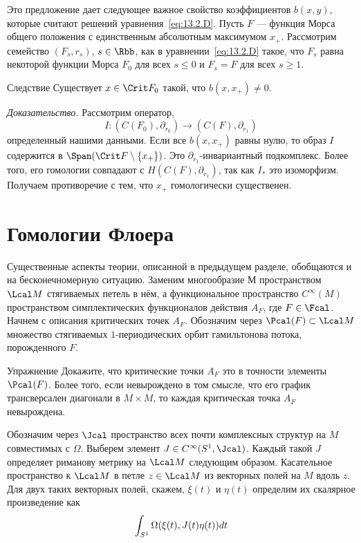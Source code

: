 Это предложение дает следующее важное свойство коэффициентов $b(x,
y)$, которые считают   решений
уравнения~\ref{eq:13.2.D}. 
Пусть $F$ --- функция Морса общего положения с единственным абсолютным
максимумом $x_{+}$.
Рассмотрим семейство $(F_{s},r_{s})$, $s\in\Rbb$, как в
уравнении~\ref{eq:13.2.D} такое, что $F_{s}$ равна некоторой функции
Морса $F_{0}$ для всех $s\leq0$ и $F_{s} = F$ для всех $s\geq1$.


\begin{thm}{Следствие}\label{13.2.H}
  Существует $x\in\Crit F_{0}$ такой, что $b(x, x_{+})\neq0$.  
\end{thm}

\noindent\textit{Доказательство.}
Рассмотрим оператор,
\[
I:(C(F_{0}),\partial_{r_{0}})\to (C(F),\partial_{r_{1}})
\]
определенный нашими данными.
Если все $b(x,x_{+})$ равны нулю, то образ $I$ содержится в
$\Span(\Crit F\setminus\{x_{+}\})$. 
Это $\partial_{r_{1}}$-инвариантный подкомплекс.
Более того, его гомологии совпадают с $H(C(F),\partial_{r_{1}})$,
так как $I_{*}$ это изоморфизм.
Получаем противоречие с тем, что $x_{+}$ гомологически существенен.
\qeds

\section{Гомологии Флоера}\label{sec:13.3}
Существенные аспекты теории, описанной в предыдущем разделе,
обобщаются и на бесконечномерную ситуацию.  Заменим многообразие $М$
пространством $\Lcal M$ стягиваемых петель в нём, а функциональное
пространство $C^{\infty}(M)$ пространством симплектических
функционалов действия $A_{F}$, где $F\in\Fcal$.
Начнем с описания критических точек $A_{F}$.
Обозначим через $\Pcal(F)\subset\Lcal M$ множество стягиваемых
$1$-периодических орбит гамильтонова потока, порожденного $F$.

\begin{ex}{Упражнение}\label{13.3.A}
  Докажите, что критические точки $A_{F}$ это в точности элементы
  $\Pcal(F)$.
  Более того, если  невырождено в том смысле, что его график
  трансверсален диагонали в $M\times M$, то каждая критическая точка
  $A_{F}$ невырождена.
\end{ex}
Обозначим через $\Jcal$ пространство всех почти комплексных структур
на $M$ совместимых с $\Omega$.
Выберем элемент $J\in C^{\infty}(S^{1},\Jcal)$.
Каждый такой $J$ определяет риманову метрику на $\Lcal M$ следующим образом.
Касательное пространство к $\Lcal M$ в петле $z\in\Lcal M$
 из векторных полей на $M$ вдоль $z$.
Для двух таких векторных полей, скажем, $\xi(t)$ и $\eta(t)$ определим
их скалярное произведение как
\[
\int_{S^{1}}\Omega(\xi(t),J(t)\eta(t))d t
\]

